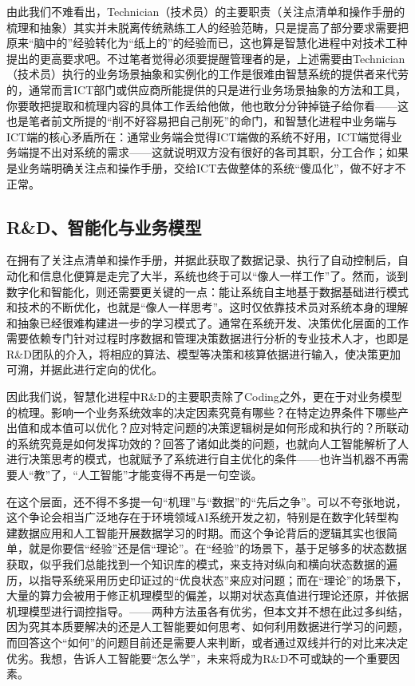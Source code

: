 \documentclass[
]{book}
\begin{document}
由此我们不难看出，Technician（技术员）的主要职责（关注点清单和操作手册的梳理和抽象）其实并未脱离传统熟练工人的经验范畴，只是提高了部分要求需要把原来``脑中的''经验转化为``纸上的''的经验而已，这也算是智慧化进程中对技术工种提出的更高要求吧。不过笔者觉得必须要提醒管理者的是，上述需要由Technician（技术员）执行的业务场景抽象和实例化的工作是很难由智慧系统的提供者来代劳的，通常而言ICT部门或供应商所能提供的只是进行业务场景抽象的方法和工具，你要敢把提取和梳理内容的具体工作丢给他做，他也敢分分钟掉链子给你看------这也是笔者前文所提的``削不好容易把自己削死''的命门，和智慧化进程中业务端与ICT端的核心矛盾所在：通常业务端会觉得ICT端做的系统不好用，ICT端觉得业务端提不出对系统的需求------这就说明双方没有很好的各司其职，分工合作；如果是业务端明确关注点和操作手册，交给ICT去做整体的系统``傻瓜化''，做不好才不正常。

\hypertarget{rdux667aux80fdux5316ux4e0eux4e1aux52a1ux6a21ux578b}{%
\subsection{R\&D、智能化与业务模型}\label{rdux667aux80fdux5316ux4e0eux4e1aux52a1ux6a21ux578b}}

在拥有了关注点清单和操作手册，并据此获取了数据记录、执行了自动控制后，自动化和信息化便算是走完了大半，系统也终于可以``像人一样工作''了。然而，谈到数字化和智能化，则还需要更关键的一点：能让系统自主地基于数据基础进行模式和技术的不断优化，也就是``像人一样思考''。这时仅依靠技术员对系统本身的理解和抽象已经很难构建进一步的学习模式了。通常在系统开发、决策优化层面的工作需要依赖专门针对过程时序数据和管理决策数据进行分析的专业技术人才，也即是R\&D团队的介入，将相应的算法、模型等决策和核算依据进行输入，使决策更加可溯，并据此进行定向的优化。

因此我们说，智慧化进程中R\&D的主要职责除了Coding之外，更在于对业务模型的梳理。影响一个业务系统效率的决定因素究竟有哪些？在特定边界条件下哪些产出值和成本值可以优化？应对特定问题的决策逻辑树是如何形成和执行的？所联动的系统究竟是如何发挥功效的？回答了诸如此类的问题，也就向人工智能解析了人进行决策思考的模式，也就赋予了系统进行自主优化的条件------也许当机器不再需要人``教''了，``人工智能''才能变得不再是一句空谈。

在这个层面，还不得不多提一句``机理''与``数据''的``先后之争''。可以不夸张地说，这个争论会相当广泛地存在于环境领域AI系统开发之初，特别是在数字化转型构建数据应用和人工智能开展数据学习的时期。而这个争论背后的逻辑其实也很简单，就是你要信``经验''还是信``理论''。在``经验''的场景下，基于足够多的状态数据获取，似乎我们总能找到一个知识库的模式，来支持对纵向和横向状态数据的遍历，以指导系统采用历史印证过的``优良状态''来应对问题；而在``理论''的场景下，大量的算力会被用于修正机理模型的偏差，以期对状态真值进行理论还原，并依据机理模型进行调控指导。------两种方法虽各有优劣，但本文并不想在此过多纠结，因为究其本质要解决的还是人工智能要如何思考、如何利用数据进行学习的问题，而回答这个``如何''的问题目前还是需要人来判断，或者通过双线并行的对比来决定优劣。我想，告诉人工智能要``怎么学''，未来将成为R\&D不可或缺的一个重要因素。
\end{document}
